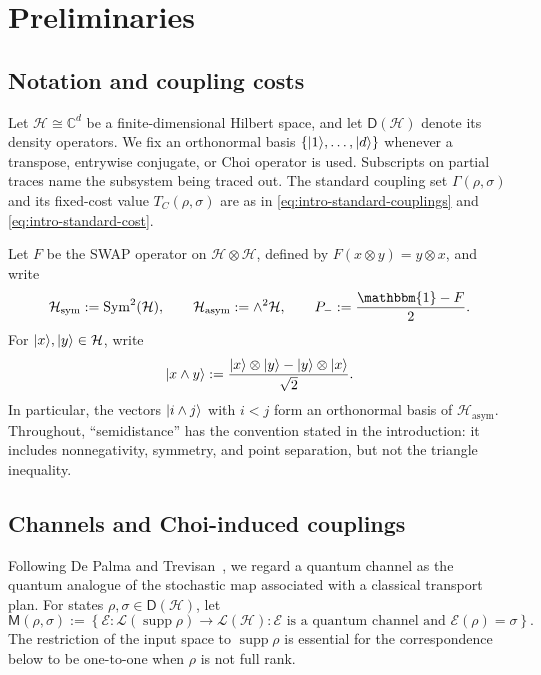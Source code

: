 \documentclass[11pt]{article}
\newcommand{\Dens}{\mathsf{D}}
\newcommand{\Id}{\mathbbm{1}}
\DeclarePairedDelimiter\ket{\lvert}{\rangle}
\newcommand{\calE}{\mathcal{E}}
\newcommand{\calH}{\mathcal{H}}
\begin{document}
\section{Preliminaries}\label{sec:preliminaries}

\subsection{Notation and coupling costs}

Let $\calH\cong\mathbb{C}^d$ be a finite-dimensional Hilbert space, and
let $\Dens(\calH)$ denote its density operators.  We fix an orthonormal basis
$\{\ket{1},\ldots,\ket{d}\}$ whenever a transpose, entrywise conjugate, or
Choi operator is used.  Subscripts on partial traces name the subsystem being
traced out.  The standard coupling set $\Gamma(\rho,\sigma)$ and its fixed-cost
value $T_C(\rho,\sigma)$ are as in
\eqref{eq:intro-standard-couplings} and \eqref{eq:intro-standard-cost}.

Let $F$ be the SWAP operator on $\calH\otimes\calH$, defined by
$F(x\otimes y)=y\otimes x$, and write
\begin{equation}\label{eq:symmetric-decomposition}
    \calH_{\mathrm{sym}}:=\operatorname{Sym}^2(\calH),
    \qquad
    \calH_{\mathrm{asym}}:=\wedge^2\calH,
    \qquad
    P_-:=\frac{\Id-F}{2}.
\end{equation}
For $\ket{x},\ket{y}\in\calH$, write
\begin{equation}\label{eq:wedge-basis}
    \ket{x\wedge y}
    :=\frac{\ket{x}\otimes\ket{y}-\ket{y}\otimes\ket{x}}{\sqrt{2}}.
\end{equation}
In particular, the vectors $\ket{i\wedge j}$ with $i<j$ form an
orthonormal basis of $\calH_{\mathrm{asym}}$.
Throughout, ``semidistance'' has the convention stated in the introduction:
it includes nonnegativity, symmetry, and point separation, but not the
triangle inequality.

\subsection{Channels and Choi-induced couplings}

Following De Palma and Trevisan~\cite{DT21}, we regard a quantum channel as
the quantum analogue of the stochastic map associated with a classical
transport plan.  For states $\rho,\sigma\in\Dens(\calH)$, let
\begin{equation}\label{eq:quantum-transport-plans}
    \mathsf{M}(\rho,\sigma)
    :=
    \left\{
        \calE:\mathcal{L}(\operatorname{supp}\rho)
        \to\mathcal{L}(\calH):
        \calE\text{ is a quantum channel and }\calE(\rho)=\sigma
    \right\}.
\end{equation}
The restriction of the input space to $\operatorname{supp}\rho$ is essential
for the correspondence below to be one-to-one when $\rho$ is not full rank.
\end{document}
